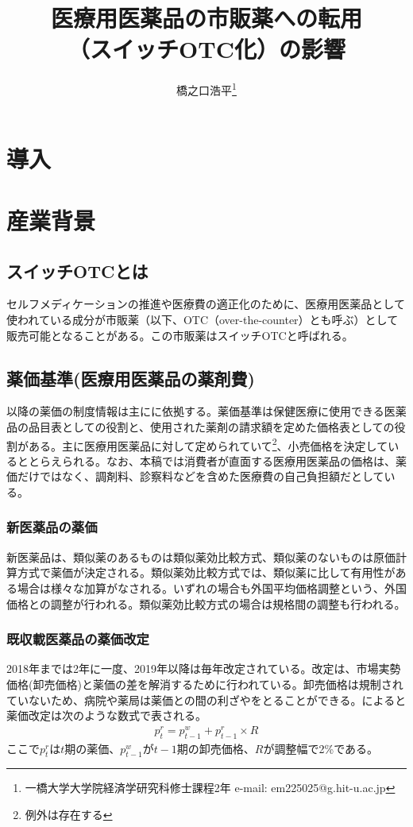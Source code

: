 \documentclass[a4paper,12pt,uplatex]{jsarticle}
\title{\vspace{-3cm}医療用医薬品の市販薬への転用\\（スイッチOTC化）の影響}
\author{橋之口浩平\thanks{一橋大学大学院経済学研究科修士課程2年 e-mail: em225025@g.hit-u.ac.jp}}
\date{}
\theoremstyle{definition}
\begin{document}
\maketitle{}
\section{導入}
\section{産業背景}
\subsection{スイッチOTCとは}
セルフメディケーションの推進や医療費の適正化のために、医療用医薬品として使われている成分が市販薬（以下、OTC（over-the-counter）とも呼ぶ）として販売可能となることがある。この市販薬はスイッチOTCと呼ばれる。
\subsection{薬価基準(医療用医薬品の薬剤費)}
以降の薬価の制度情報は主に\cite{takahashi}に依拠する。薬価基準は保健医療に使用できる医薬品の品目表としての役割と、使用された薬剤の請求額を定めた価格表としての役割がある。主に医療用医薬品に対して定められていて\footnote{例外は存在する}、小売価格を決定しているととらえられる。なお、本稿では消費者が直面する医療用医薬品の価格は、薬価だけではなく、調剤料、診察料などを含めた医療費の自己負担額だとしている。

\subsubsection{新医薬品の薬価}
新医薬品は、類似薬のあるものは類似薬効比較方式、類似薬のないものは原価計算方式で薬価が決定される。類似薬効比較方式では、類似薬に比して有用性がある場合は様々な加算がなされる。いずれの場合も外国平均価格調整という、外国価格との調整が行われる。類似薬効比較方式の場合は規格間の調整も行われる。
\subsubsection{既収載医薬品の薬価改定}
2018年までは2年に一度、2019年以降は毎年改定されている。改定は、市場実勢価格(卸売価格)と薬価の差を解消するために行われている。卸売価格は規制されていないため、病院や薬局は薬価との間の利ざやをとることができる。\cite{Iizuka2007}によると薬価改定は次のような数式で表される。
\begin{align*}
p^r_t=p^w_{t-1}+p^r_{t-1}\times R
\end{align*}
ここで\(p^r_t\)は\(t\)期の薬価、\(p^w_{t-1}\)が\(t-1\)期の卸売価格、\(R\)が調整幅で2\%である。
\end{document}
